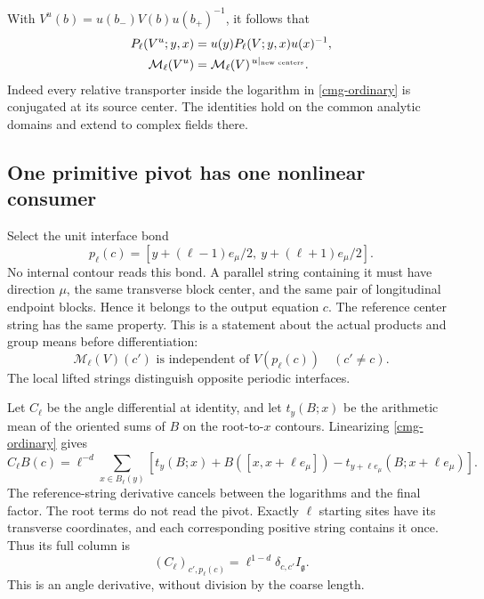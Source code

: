 \documentclass[11pt]{article}
\theoremstyle{remark}
\begin{document}
With $V^u(b)=u(b_-)V(b)u(b_+)^{-1}$, it follows that
\begin{align}
 P_\ell(V^u;y,x)&=u(y)P_\ell(V;y,x)u(x)^{-1},\notag\\
 \mathcal M_\ell(V^u)&=
       \mathcal M_\ell(V)^{\,u|_{\text{new centers}}}.
 \label{cmg-primitive-covariance}
\end{align}
Indeed every relative transporter inside the logarithm in
\eqref{cmg-ordinary} is conjugated at its source center. The identities
hold on the common analytic domains and extend to complex fields there.

\subsection{One primitive pivot has one nonlinear consumer}
\label{cmg-primitive-section}

Select the unit interface bond
\begin{equation}
 p_\ell(c)=
 [y+(\ell-1)e_\mu/2,\ y+(\ell+1)e_\mu/2].
 \label{cmg-primitive-pivot}
\end{equation}
No internal contour reads this bond. A parallel string containing it
must have direction $\mu$, the same transverse block center, and
the same pair of longitudinal endpoint blocks. Hence it belongs to
the output equation $c$. The reference center string has the same
property. This is a statement about the actual products and group
means before differentiation:
\begin{equation}
 \mathcal M_\ell(V)(c')\text{ is independent of }V(p_\ell(c))
 \quad(c'\ne c).
 \label{cmg-primitive-incidence}
\end{equation}
The local lifted strings distinguish opposite periodic interfaces.

Let $C_\ell$ be the angle differential at identity, and let
$t_y(B;x)$ be the arithmetic mean of the oriented sums of $B$ on
the root-to-$x$ contours. Linearizing \eqref{cmg-ordinary} gives
\begin{equation}
 C_\ell B(c)=\ell^{-d}\sum_{x\in B_\ell(y)}
 \left[t_y(B;x)+B([x,x+\ell e_\mu])
             -t_{y+\ell e_\mu}(B;x+\ell e_\mu)\right].
 \label{cmg-primitive-linear}
\end{equation}
The reference-string derivative cancels between the logarithms and
the final factor. The root terms do not read the pivot. Exactly $\ell$
starting sites have its transverse coordinates, and each corresponding
positive string contains it once. Thus its full column is
\begin{equation}
 (C_\ell)_{c',p_\ell(c)}
       =\ell^{1-d}\delta_{c,c'}I_{\mathfrak g}.
 \label{cmg-primitive-coefficient}
\end{equation}
This is an angle derivative, without division by the coarse length.
\end{document}
